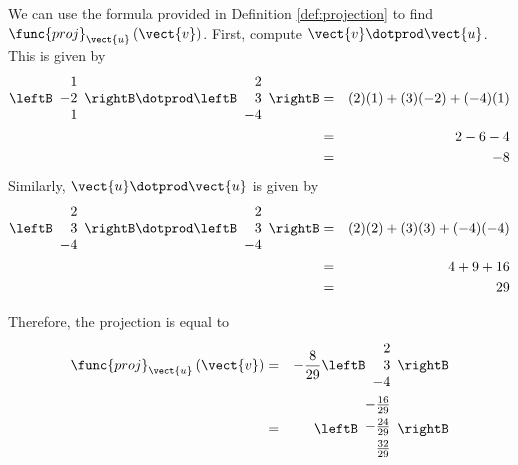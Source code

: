 \begin{solution}
We can use the formula provided in Definition \ref{def:projection} to find $\func{proj}_{\vect{u}}\left( \vect{v}\right)$.
First, compute $\vect{v} \dotprod \vect{u}$. 
This is given by 
\begin{eqnarray*}
\leftB
\begin{array}{r}
1 \\
-2 \\
1
\end{array}
\rightB
 \dotprod
\leftB
\begin{array}{r}
2 \\
3 \\
-4
\end{array}
\rightB
&=&
(2)(1) + (3)(-2) + (-4)(1) \\
&=& 
2 - 6 - 4 \\
&=& -8
\end{eqnarray*}
Similarly, $\vect{u} \dotprod \vect{u}$ is given by 
\begin{eqnarray*}
\leftB
\begin{array}{r}
2 \\
3 \\
-4 
\end{array}
\rightB
 \dotprod
\leftB
\begin{array}{r}
2 \\
3 \\
-4
\end{array}
\rightB
&=&
(2)(2) + (3)(3) + (-4)(-4) \\
&=& 
4 + 9 + 16 \\
&=& 29
\end{eqnarray*}

Therefore, the projection is equal to  
\begin{eqnarray*}
\func{proj}_{\vect{u}}\left( \vect{v}\right)
&=&-\frac{8}{29} 
\leftB
\begin{array}{r}
2 \\
3 \\
-4
\end{array}
\rightB \\
&=& 
\leftB
\begin{array}{r}
-\vspace{0.05in}\frac{16}{29} \\
-\vspace{0.05in}\frac{24}{29} \\
\vspace{0.05in}\frac{32}{29}
\end{array}
\rightB
\end{eqnarray*}
\end{solution}

